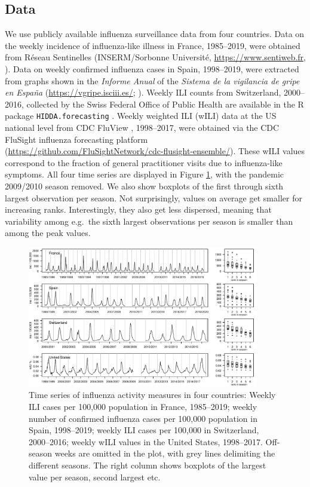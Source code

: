 \documentclass{article}
\begin{document}
\subsection{Data}

We use publicly available influenza surveillance data from four countries. Data on the weekly incidence of influenza-like illness in France, 1985--2019, were obtained from Réseau Sentinelles (INSERM/Sorbonne Université, \url{https://www.sentiweb.fr}, \citealt{Flahault2006}). Data on weekly confirmed influenza cases in Spain, 1998--2019, were extracted from graphs shown in the \textit{Informe Anual} of the \textit{Sistema de la vigilancia de gripe en Espa\~na} (\url{https://vgripe.isciii.es/}; \citealt{SVGE2019}). Weekly ILI counts from Switzerland, 2000--2016, collected by the Swiss Federal Office of Public Health are available in the R package \texttt{HIDDA.forecasting} \citep{Held2019}. Weekly weighted ILI (wILI) data at the US national level from CDC FluView \citep{Charbonneau2019}, 1998--2017, were obtained via the CDC FluSight influenza forecasting platform (\url{https://github.com/FluSightNetwork/cdc-flusight-ensemble/}). These wILI values correspond to the fraction of general practitioner visits due to influenza-like symptoms. All four time series are displayed in Figure \ref{fig:data}, with the pandemic 2009/2010 season removed. We also show boxplots of the first through sixth largest observation per season. Not surprisingly, values on average get smaller for increasing ranks. Interestingly, they also get less dispersed, meaning that variability among e.g.\ the sixth largest observations per season is smaller than among the peak values. 


\begin{figure}[h]
\center
\includegraphics[width=0.9\textwidth]{figure/plot_data.pdf}
\caption{Time series of influenza activity measures in four countries: Weekly ILI cases per 100,000 population in France, 1985--2019; weekly number of confirmed influenza cases per 100,000 population in Spain, 1998--2019; weekly ILI cases per 100,000 in Switzerland, 2000--2016; weekly wILI values in the United States, 1998--2017. Off-season weeks are omitted in the plot, with grey lines delimiting the different seasons. The right column shows boxplots of the largest value per season, second largest etc.}
\label{fig:data}
\end{figure}
\end{document}
